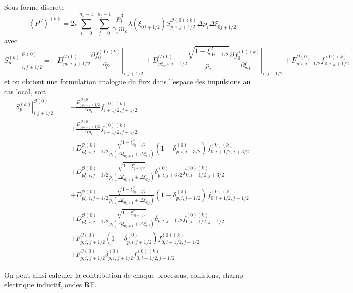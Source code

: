 Sous forme discrete \[
\left\langle P^{\mathcal{O}}\right\rangle ^{(k)}=2\pi\sum_{i=0}^{n_{p}-1}\;\sum_{j=0}^{n_{\xi}-1}\frac{p_{i}^{3}}{\gamma_{i}m_{e}}\lambda\left(\xi_{0j+1/2}\right)S_{p,i,j+1/2}^{\mathcal{O}(0)(k)}\Delta p_{i}\Delta\xi_{0j+1/2}\]
 avec \[
\left.S_{p}^{(k)}\right|_{i,j+1/2}^{\mathcal{O}(0)}=-D_{pp,i,j+1/2}^{\mathcal{O}(0)}\left.\frac{\partial f_{0}^{(0)(k)}}{\partial p}\right|_{i,j+1/2}+D_{p\xi_{0},i,j+1/2}^{\mathcal{O}(0)}\frac{\sqrt{1-\xi_{0j+1/2}^{2}}}{p_{i}}\left.\frac{\partial f_{0}^{(0)(k)}}{\partial\xi_{0}}\right|_{i,j+1/2}+F_{p,i,j+1/2}^{\mathcal{O}(0)}f_{0,i,j+1/2}^{(0)(k)}\]
 et on obtient une formulation analogue du flux dans l'espace des
impulsions au cas local, soit \begin{eqnarray*}
\left.S_{p}^{\left(k\right)}\right|_{i,j+1/2}^{\mathcal{O}(0)} & = & -\frac{D_{pp,i,j+1/2}^{\mathcal{O}(0)}}{\Delta p_{i}}f_{i+1/2,j+1/2}^{(0)(k)}\\
 &  & +\frac{D_{pp,i,j+1/2}^{\mathcal{O}(0)}}{\Delta p_{i}}f_{i-1/2,j+1/2}^{(0)(k)}\\
 &  & +D_{p\xi,i,j+1/2}^{\mathcal{O}(0)}\frac{\sqrt{1-\xi_{0j+1/2}^{2}}}{p_{i}\left(\Delta\xi_{0j+1}+\Delta\xi_{0j}\right)}\left(1-\delta_{p,i,j+3/2}^{(0)}\right)f_{0,i+1/2,j+3/2}^{(0)(k)}\\
 &  & +D_{p\xi,i,j+1/2}^{\mathcal{O}(0)}\frac{\sqrt{1-\xi_{j+1/2}^{2}}}{p_{i}\left(\Delta\xi_{0j+1}+\Delta\xi_{0j}\right)}\delta_{p,i,j+3/2}^{(0)}f_{0,i-1/2,j+3/2}^{(0)(k)}\\
 &  & +D_{p\xi,i,j+1/2}^{\mathcal{O}(0)}\frac{\sqrt{1-\xi_{0j+1/2}^{2}}}{p_{i}\left(\Delta\xi_{0j+1}+\Delta\xi_{0j}\right)}\left(1-\delta_{p,i,j-1/2}^{(0)}\right)f_{0,i+1/2,j-1/2}^{(0)(k)}\\
 &  & +D_{p\xi,i,j+1/2}^{\mathcal{O}(0)}\frac{\sqrt{1-\xi_{0j+1/2}^{2}}}{p_{i}\left(\Delta\xi_{0j+1}+\Delta\xi_{0j}\right)}\delta_{p,i,j-1/2}f_{0,i-1/2,j-1/2}^{(0)(k)}\\
 &  & +F_{p,i,j+1/2}^{\mathcal{O}(0)}\left(1-\delta_{p,i,j+1/2}^{(0)}\right)f_{0,i+1/2,j+1/2}^{(0)(k)}\\
 &  & +F_{p,i,j+1/2}^{\mathcal{O}(0)}\delta_{p,i,j+1/2}^{(0)}f_{0,i-1/2,j+1/2}^{(0)(k)}\end{eqnarray*}


On peut ainsi calculer la contribution de chaque processus, collisions,
champ electrique inductif, ondes RF.
